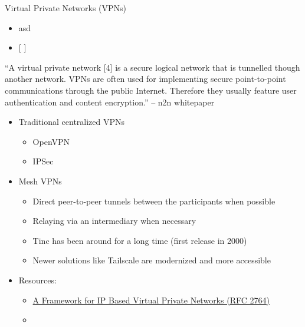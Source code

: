 \hypertarget{notes__02050-vpns.md}{}
\begin{block}{Virtual Private Networks (VPNs)}
\protect\hypertarget{notes__02050-vpns.md__virtual-private-networks-vpns}{}
\begin{itemize}
\item
  asd
\item
  {[} {]}
\end{itemize}

``A virtual private network {[}4{]} is a secure logical network that is
tunnelled though another network. VPNs are often used for implementing
secure point-to-point communications through the public Internet.
Therefore they usually feature user authentication and content
encryption.'' -- n2n whitepaper

\begin{itemize}
\item
  Traditional centralized VPNs

  \begin{itemize}
  \tightlist
  \item
    OpenVPN
  \item
    IPSec
  \end{itemize}
\item
  Mesh VPNs

  \begin{itemize}
  \tightlist
  \item
    Direct peer-to-peer tunnels between the participants when possible
  \item
    Relaying via an intermediary when necessary
  \item
    Tinc has been around for a long time (first release in 2000)
  \item
    Newer solutions like Tailscale are modernized and more accessible
  \end{itemize}
\item
  Resources:

  \begin{itemize}
  \tightlist
  \item
    \href{https://www.rfc-editor.org/rfc/rfc2764.html}{A Framework for
    IP Based Virtual Private Networks (RFC 2764)}
  \item
  \end{itemize}
\end{itemize}
\end{block}

